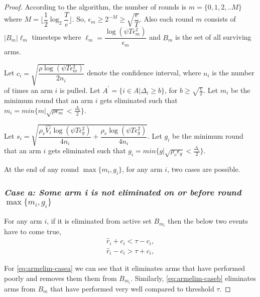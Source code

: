 \begin{proof}

According to the algorithm, the number of rounds is $m=\lbrace 0,1,2,.. M\rbrace $ where $M=\bigg\lfloor \dfrac{1}{2}\log_{2} \dfrac{T}{e}\bigg\rfloor$. So, $\epsilon_{m}\geq 2^{-M}\geq \sqrt{\dfrac{e}{T}}$. Also each round $m$ consists of $|B_{m}|\ell_{m}$ timesteps where $\ell_{m} = \dfrac{\log(\psi T \epsilon_{m}^{2})}{\epsilon_{m}}$ and $B_{m}$ is the set of all surviving arms. 

Let $c_{i} = \sqrt{\dfrac{\rho\log{(\psi T\epsilon_{m}^{2})}}{2 n_{i}}}$ denote the confidence interval, where $n_{i}$ is the number of times an arm $i$ is pulled. Let $A^{'}=\lbrace i\in A|\Delta_{i}\geq b\rbrace$, for $b\geq \sqrt{\frac{e}{T}}$. Let $m_{i}$ be the minimum round that an arm $i$ gets eliminated such that $m_{i}=min\lbrace m| \sqrt{\rho\epsilon_{m}}<\frac{\Delta_{i}}{2}\rbrace$. 


Let $s_{i}=\sqrt{\dfrac{\rho_v \hat{V_{i}} \log{(\psi T\epsilon_{g}^{2})}}{4 n_{i}} + \dfrac{\rho_v \log{(\psi T\epsilon_{g}^{2})}}{4 n_{i}}}$. Let $g_{i}$ be the minimum round that an arm $i$ gets eliminated such that $g_{i}=min\lbrace g| \sqrt{\rho_{v}\epsilon_{g}}<\frac{\Delta_{i}}{2}\rbrace$. 

At the end of any round $\max\lbrace m_{i},g_{i}\rbrace$, for any arm $i$, two cases are possible.

\subsubsection{\textit{Case a: Some arm i is not eliminated on or before round $\max\lbrace m_{i},g_{i}\rbrace$}}
For any arm $i$, if it is eliminated from active set $B_{m_{i}}$ then the below two events have to come true,
\begin{align}
\hat{r}_{i} + c_{i} < \tau - c_{i}, \label{eq:armelim-casea}\\
\hat{r}_{i} - c_{i} > \tau + c_{i}, \label{eq:armelim-caseb}
\end{align}

For \ref{eq:armelim-casea} we can see that it eliminates arms that have performed poorly and removes them them from $B_{m_{i}}$. Similarly, \ref{eq:armelim-caseb} eliminates arms from $B_{m}$ that have performed very well compared to threshold $\tau$.


\end{proof}
